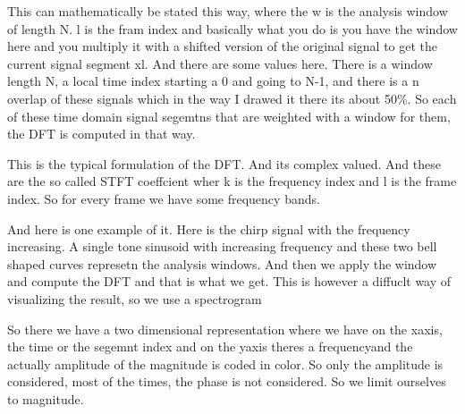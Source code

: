  This can mathematically be stated this way, where the w is the analysis window of length N. l is the fram index and basically what you do is you have the window here and you multiply it with a shifted version of the original signal to get the current signal segment xl.  And there are some values here.  There is a window length N, a local time index starting a 0 and going to N-1, and there is a n overlap of these signals which in the way I drawed it there its about 50\%.  So each of these  time domain signal segemtns that are weighted with a window for them, the DFT is computed in that way.
 
   This is the typical formulation of the DFT. And its complex valued.  And these are the so called STFT coeffcient wher k is the frequency index and l is the frame index.  So for every frame we have some frequency bands.
   
   And here is one example of it.  Here is the chirp signal with the frequency increasing. A single tone sinusoid with increasing frequency and these two bell shaped curves represetn the analysis windows.  And then we apply the window and compute the DFT and that is what we get. This is however a diffuclt way of visualizing the result, so we use a spectrogram
 
 So there we have a two dimensional representation where we have on the xaxis, the time or the segemnt index and on the yaxis theres a frequencyand the actually amplitude of the magnitude is coded in color. So only the amplitude is considered, most of the times, the phase is not considered. So we limit ourselves to magnitude.
 
